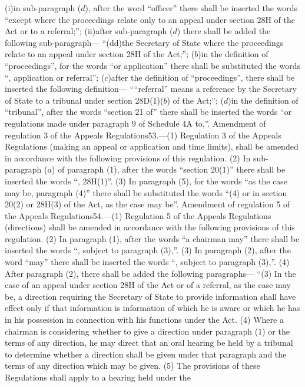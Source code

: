 \documentclass[a4paper]{article}
\begin{document}
(i)in sub-paragraph ($d$), after the word “officer” there shall be inserted the
words “except where the proceedings relate only to an appeal under section 28H
of the Act or to a referral;”;
(ii)after sub-paragraph ($d$) there shall be added the following sub-paragraph—
“(dd)the Secretary of State where the proceedings relate to an appeal under
section 28H of the Act;”;
($b$)in the definition of “proceedings”, for the words “or application” there
shall be substituted the words “, application or referral”;
($c$)after the definition of “proceedings”, there shall be inserted the following
definition—
““referral” means a reference by the Secretary of State to a tribunal under
section 28D(1)($b$) of the Act;”;
($d$)in the definition of “tribunal”, after the words “section 21 of” there shall
be inserted the words “or regulations made under paragraph 9 of Schedule 4A
to,”.
Amendment of regulation 3 of the Appeals Regulations53.—(1) Regulation 3 of the
Appeals Regulations (making an appeal or application and time limits), shall be
amended in accordance with the following provisions of this regulation.
(2) In sub-paragraph ($a$) of paragraph (1), after the words “section 20(1)” there
shall be inserted the words “, 28H(1)”.
(3) In paragraph (5), for the words “as the case may be, paragraph (4)” there
shall be substituted the words “(4) or in section 20(2) or 28H(3) of the Act, as
the case may be”.
Amendment of regulation 5 of the Appeals Regulations54.—(1) Regulation 5 of the
Appeals Regulations (directions) shall be amended in accordance with the
following provisions of this regulation.
(2) In paragraph (1), after the words “a chairman may” there shall be inserted
the words “, subject to paragraph (3),”.
(3) In paragraph (2), after the word “may” there shall be inserted the words “,
subject to paragraph (3),”.
(4) After paragraph (2), there shall be added the following paragraphs—
“(3) In the case of an appeal under section 28H of the Act or of a referral, as
the case may be, a direction requiring the Secretary of State to provide
information shall have effect only if that information is information of which
he is aware or which he has in his possession in connection with his functions
under the Act.
(4) Where a chairman is considering whether to give a direction under paragraph
(1) or the terms of any direction, he may direct that an oral hearing be held by
a tribunal to determine whether a direction shall be given under that paragraph
and the terms of any direction which may be given.
(5) The provisions of these Regulations shall apply to a hearing held under the
\end{document}
